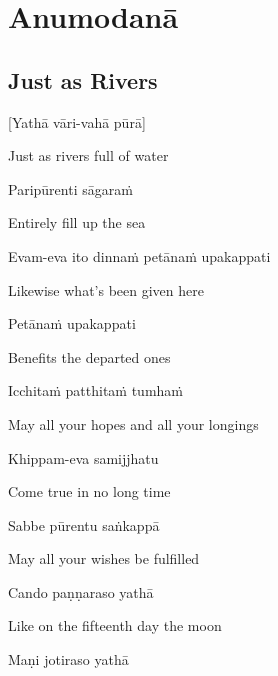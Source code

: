 \chapter{Anumodanā}

\section{Just as Rivers}


[Yathā vāri-vahā pūrā]

\begin{cprenglish}
  Just as rivers full of water
\end{cprenglish}

Paripūrenti sāgaraṁ

\begin{cprenglish}
  Entirely fill up the sea
\end{cprenglish}

Evam-eva ito dinnaṁ petānaṁ upakappati

\begin{cprenglish}
  Likewise what’s been given here
\end{cprenglish}

Petānaṁ upakappati

\begin{cprenglish}
  Benefits the departed ones
\end{cprenglish}

Icchitaṁ patthitaṁ tumhaṁ

\begin{cprenglish}
  May all your hopes and all your longings
\end{cprenglish}

Khippam-eva samijjhatu

\begin{cprenglish}
  Come true in no long time
\end{cprenglish}

Sabbe pūrentu saṅkappā

\begin{cprenglish}
  May all your wishes be fulfilled
\end{cprenglish}

Cando paṇṇaraso yathā

\begin{cprenglish}
  Like on the fifteenth day the moon
\end{cprenglish}

Maṇi jotiraso yathā


